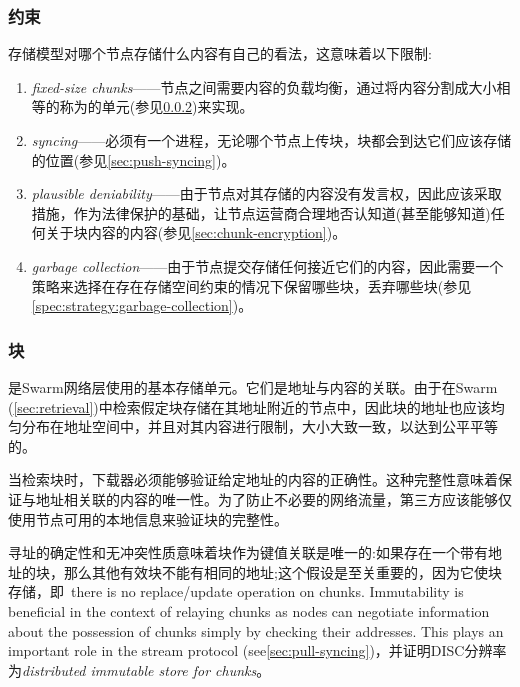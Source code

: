 \subsubsection{约束}
存储模型对哪个节点存储什么内容有自己的看法，这意味着以下限制: 

\begin{enumerate}
    \item \emph{fixed-size chunks}——节点之间需要内容的负载均衡，通过将内容分割成大小相等的称为的单元(参见\ref{sec:chunks})来实现。
    \item \emph{syncing}——必须有一个进程，无论哪个节点上传块，块都会到达它们应该存储的位置(参见\ref{sec:push-syncing})。
    \item \emph{plausible deniability}——由于节点对其存储的内容没有发言权，因此应该采取措施，作为法律保护的基础，让节点运营商合理地否认知道(甚至能够知道)任何关于块内容的内容(参见\ref{sec:chunk-encryption})。
    \item \emph{garbage collection}——由于节点提交存储任何接近它们的内容，因此需要一个策略来选择在存在存储空间约束的情况下保留哪些块，丢弃哪些块(参见\ref{spec:strategy:garbage-collection})。 
\end{enumerate}

\subsubsection{块}\label{sec:chunks}

是Swarm网络层使用的基本存储单元。它们是地址与内容的关联。由于在Swarm (\ref{sec:retrieval})中检索假定块存储在其地址附近的节点中，因此块的地址也应该均匀分布在地址空间中，并且对其内容进行限制，大小大致一致，以达到公平平等的。

当检索块时，下载器必须能够验证给定地址的内容的正确性。这种完整性意味着保证与地址相关联的内容的唯一性。为了防止不必要的网络流量，第三方应该能够仅使用节点可用的本地信息来验证块的完整性。

寻址的确定性和无冲突性质意味着块作为键值关联是唯一的:如果存在一个带有地址的块，那么其他有效块不能有相同的地址;这个假设是至关重要的，因为它使块存储，即\ there is no replace/update operation on chunks. Immutability is beneficial in the context of relaying chunks as nodes can negotiate information about the possession of chunks simply by checking their addresses. This plays an important role in the stream protocol (see\ref{sec:pull-syncing})，并证明DISC分辨率为\emph{distributed immutable store for chunks}。

